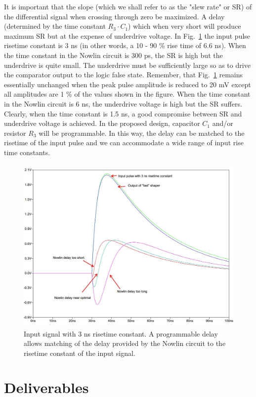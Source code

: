 \documentclass[12pt, onecolumn]{IEEEtran}
\begin{document}
\noindent
It is important that the slope (which we shall refer to as the "slew rate" or SR) of the differential signal when crossing through zero be maximized.  A delay (determined by the time constant $R_3 \cdot C_1$) which when very short will produce maximum SR but at the expense of underdrive voltage. In Fig.~\ref{TypicalWaveforms} the input pulse risetime constant is 3 ns (in other words,  a 10 - 90 \% rise time of 6.6 ns).  When the time constant in the Nowlin circuit is 300 ps, the SR is high but the underdrive is quite small. The underdrive must be sufficiently large so as to drive the comparator output to the logic false state.  Remember, that Fig.~\ref{TypicalWaveforms} remains essentially unchanged when the peak pulse amplitude is reduced to 20 mV except all amplitudes are 1 \% of the values shown in the figure. When the time constant in the Nowlin circuit is 6 ns, the underdrive voltage is high but the SR suffers. Clearly, when the time constant is 1.5 ns, a good compromise between SR and underdrive voltage is achieved. In the proposed design, capacitor $C_1$ and/or resistor $R_3$ will be programmable. In this way, the delay can be matched to the risetime of the input pulse and we can accommodate a wide range of input rise time constants. \\

\begin{figure}[htbp!]
	\centering
 	\includegraphics[scale=0.4,keepaspectratio=true]{./images/nowlin_fast.jpg}
 	\caption{Input signal with 3 ns risetime constant. A programmable delay allows matching of the delay provided by the Nowlin circuit to the risetime constant of the input signal.}
 	\label{TypicalWaveforms}
\end{figure}

\section*{Deliverables}

\noindent
\end{document}

